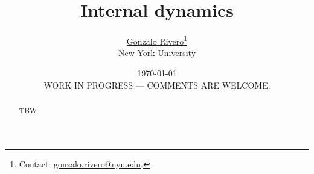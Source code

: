 \documentclass[11pt]{article}
\begin{document}
\title{Internal dynamics}

\author{\href{mailto:gonzalo.rivero@nyu.edu}{Gonzalo Rivero}\footnote{Contact:
    \href{mailto:gonzalo.rivero@nyu.edu}{gonzalo.rivero@nyu.edu}.} \\ New York University
}

\date{\today \\ \vspace*{2cm}  WORK IN PROGRESS --- COMMENTS ARE WELCOME.}

\maketitle


\begin{abstract}
TBW
\end{abstract}

\newpage


% 
% 
% 

\newpage

% 
% 
\end{document}
